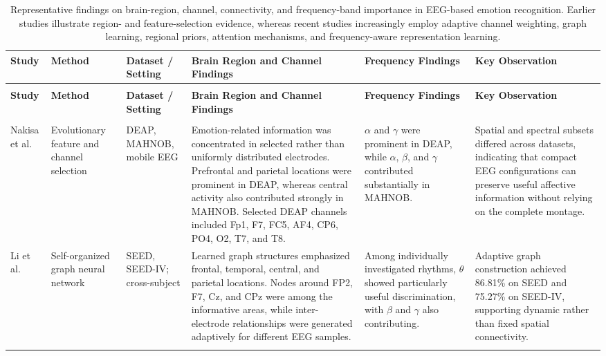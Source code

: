 \documentclass{WileyMSP-template}
\newcommand{\lightrowsep}{%
    \arrayrulecolor{lightrowgray}%
    \specialrule{0.30pt}{3.5pt}{3.5pt}%
    \arrayrulecolor{black}%
}
\begin{document}
\begin{xltabular}{\textwidth}{
@{}
>{\RaggedRight\arraybackslash}p{0.10\textwidth}
>{\RaggedRight\arraybackslash}p{0.13\textwidth}
>{\RaggedRight\arraybackslash}p{0.11\textwidth}
>{\RaggedRight\arraybackslash}X
>{\RaggedRight\arraybackslash}X
>{\RaggedRight\arraybackslash}X
@{}
}

\caption{Representative findings on brain-region, channel, connectivity, and frequency-band importance in EEG-based emotion recognition. Earlier studies illustrate region- and feature-selection evidence, whereas recent studies increasingly employ adaptive channel weighting, graph learning, regional priors, attention mechanisms, and frequency-aware representation learning.}
\label{tab:brain_channel_band_importance}
\\

\toprule
\textbf{Study} &
\textbf{Method} &
\textbf{Dataset / Setting} &
\textbf{Brain Region and Channel Findings} &
\textbf{Frequency Findings} &
\textbf{Key Observation} \\
\midrule
\endfirsthead

 \\
\toprule
\textbf{Study} &
\textbf{Method} &
\textbf{Dataset / Setting} &
\textbf{Brain Region and Channel Findings} &
\textbf{Frequency Findings} &
\textbf{Key Observation} \\
\midrule
\endhead

\midrule
{} \\
\endfoot

\bottomrule
\endlastfoot

Nakisa et al. \cite{brcfi_nakisa2018}
&
Evolutionary feature and channel selection
&
DEAP, MAHNOB, mobile EEG
&
Emotion-related information was concentrated in selected rather than uniformly distributed electrodes. Prefrontal and parietal locations were prominent in DEAP, whereas central activity also contributed strongly in MAHNOB. Selected DEAP channels included Fp1, F7, FC5, AF4, CP6, PO4, O2, T7, and T8.
&
$\alpha$ and $\gamma$ were prominent in DEAP, while $\alpha$, $\beta$, and $\gamma$ contributed substantially in MAHNOB.
&
Spatial and spectral subsets differed across datasets, indicating that compact EEG configurations can preserve useful affective information without relying on the complete montage.
\\
\lightrowsep

Li et al. \cite{brcfi_li2021sognn}
&
Self-organized graph neural network
&
SEED, SEED-IV; cross-subject
&
Learned graph structures emphasized frontal, temporal, central, and parietal locations. Nodes around FP2, F7, Cz, and CPz were among the informative areas, while inter-electrode relationships were generated adaptively for different EEG samples.
&
Among individually investigated rhythms, $\theta$ showed particularly useful discrimination, with $\beta$ and $\gamma$ also contributing.
&
Adaptive graph construction achieved 86.81\% on SEED and 75.27\% on SEED-IV, supporting dynamic rather than fixed spatial connectivity.
\\
\lightrowsep


\end{xltabular}
\end{document}
